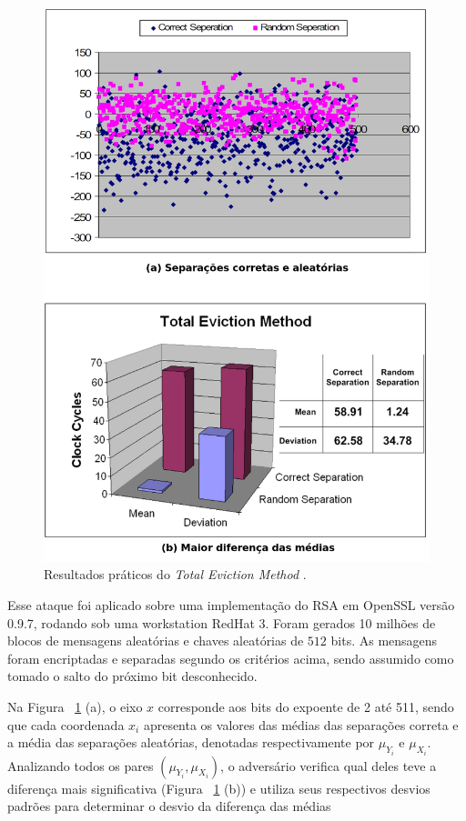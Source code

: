 \begin{figure}[ht]
	\centering
	\includegraphics[width=.7\textwidth]{figures/totaleviction.jpg}
	\caption{Resultados pr\'{a}ticos do \textit{Total Eviction Method} \cite{Jean-Pierre06predictingsecret}.}
	\label{fig:Fig_totaleviction}
\end{figure}

Esse ataque foi aplicado sobre uma implementa\c{c}\~{a}o do RSA em OpenSSL vers\~{a}o 0.9.7, rodando sob uma workstation RedHat 3. Foram gerados 10 milh\~{o}es de blocos de mensagens aleat\'{o}rias e chaves aleat\'{o}rias de $512$ bits. As mensagens foram encriptadas e separadas segundo os crit\'{e}rios acima, sendo assumido como tomado o salto do pr\'{o}ximo bit desconhecido.
       
Na Figura ~\ref{fig:Fig_totaleviction} (a), o eixo $x$ corresponde aos bits do expoente de 2 at\'{e} 511, sendo que cada coordenada $x_{i}$ apresenta os valores das m\'{e}dias das separa\c{c}\~{o}es correta e a m\'{e}dia das separa\c{c}\~{o}es aleat\'{o}rias, denotadas respectivamente por $\mu_{Y_{i}}$ e $\mu_{X_{i}}$. Analizando todos os pares $(\mu_{Y_{i}}, \mu_{X_{i}})$, o advers\'{a}rio verifica  qual deles teve a diferen\c{c}a mais significativa (Figura ~\ref{fig:Fig_totaleviction} (b)) e utiliza seus respectivos desvios padr\~{o}es para determinar o desvio da diferen\c{c}a das m\'{e}dias

